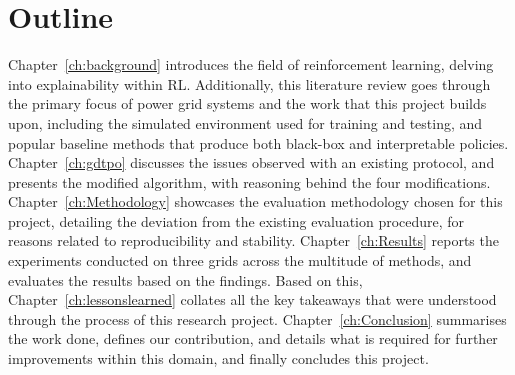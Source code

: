 \section{Outline}

Chapter~\ref{ch:background} introduces the field of reinforcement learning, delving into explainability within RL. Additionally, this literature review goes through the primary focus of power grid systems and the work that this project builds upon, including the simulated environment used for training and testing, and popular baseline methods that produce both black-box and interpretable policies. Chapter~\ref{ch:gdtpo} discusses the issues observed with an existing protocol, and presents the modified algorithm, with reasoning behind the four modifications. Chapter~\ref{ch:Methodology} showcases the evaluation methodology chosen for this project, detailing the deviation from the existing evaluation procedure, for reasons related to reproducibility and stability. Chapter~\ref{ch:Results} reports the experiments conducted on three grids across the multitude of methods, and evaluates the results based on the findings. Based on this, Chapter~\ref{ch:lessonslearned} collates all the key takeaways that were understood through the process of this research project. Chapter~\ref{ch:Conclusion} summarises the work done, defines our contribution, and details what is required for further improvements within this domain, and finally concludes this project.